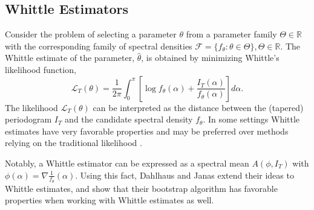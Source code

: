 \subsection*{Whittle Estimators}
Consider the problem of selecting a parameter $\theta$ from a parameter family $\Theta \in \mathbb{R}$ with the corresponding family of spectral densities $\mathcal{F}=\{f_\theta: \theta \in \Theta\}, \Theta \in \mathbb{R}$. The Whittle estimate of the parameter, $\hat{\theta}$, is obtained by minimizing Whittle's likelihood function,
	\[
	 \mathcal{L}_T(\theta) = \frac{1}{2\pi}\int_0^\pi \left[ \log f_\theta (\alpha) + \frac{I_T(\alpha)}{f_\theta(\alpha)} \right]d\alpha.
	\]
The likelihood $\mathcal{L}_T(\theta)$ can be interpreted as the distance between the (tapered) periodogram $I_T$ and the candidate spectral density $f_\theta$. In some settings Whittle estimates have very favorable properties and may be preferred over methods relying on the traditional likelihood \cite{fox}.

Notably, a Whittle estimator can be expressed as a spectral mean $A(\phi,I_T)$ with $\phi(\alpha) = \nabla \frac{1}{f_\theta}(\alpha)$. Using this fact, Dahlhaus and Janas extend their ideas to Whittle estimates, and show that their bootstrap algorithm has favorable properties when working with Whittle estimates as well.



